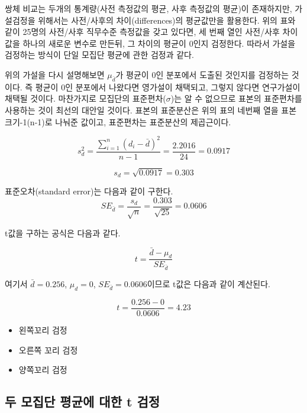 \documentclass[
]{book}
\begin{document}
쌍체 비교는 두개의 통계량(사전 측정값의 평균, 사후 측정값의 평균)이 존재하지만, 가설검정을 위해서는 사전/사후의 차이(differences)의 평균값만을 활용한다. 위의 표와 같이 25명의 사전/사후 직무수준 측정값을 갖고 있다면, 세 번째 열인 사전/사후 차이값을 하나의 새로운 변수로 만든뒤, 그 차이의 평균이 0인지 검정한다. 따라서 가설을 검정하는 방식이 단일 모집단 평균에 관한 검정과 같다.

위의 가설을 다시 설명해보면 \(\mu_{\bar{d}}\)가 평균이 0인 분포에서 도출된 것인지를 검정하는 것이다. 즉 평균이 0인 분포에서 나왔다면 영가설이 채택되고, 그렇지 않다면 연구가설이 채택될 것이다. 마찬가지로 모집단의 표준편차(\(\sigma\))는 알 수 없으므로 표본의 표준편차를 사용하는 것이 최선의 대안일 것이다. 표본의 표준분산은 위의 표의 네번째 열을 표본크기-1(n-1)로 나눠준 값이고, 표준편차는 표준분산의 제곱근이다.

\begin{equation}
s_d^2=\frac{\sum_{i=1}^{n}(d_i-\bar d)^2}{n-1}
=\frac{2.2016}{24}
=0.0917
\label{eq:pairedvar}
\end{equation}

\begin{equation}
s_d
=
\sqrt{0.0917}
=
0.303
\label{eq:pairedsd}
\end{equation}

표준오차(standard error)는 다음과 같이 구한다.
\begin{equation}
SE_{\bar d}
=
\frac{s_d}{\sqrt n}
=
\frac{0.303}{\sqrt{25}}
=
0.0606
\label{eq:pairedse}
\end{equation}

t값을 구하는 공식은 다음과 같다.

\begin{equation}
t
=
\frac{\bar d-\mu_d}
{SE_{\bar d}}
\label{eq:pairedt}
\end{equation}

여기서 \(\bar d=0.256\), \(\mu_d=0\), \(SE_{\bar d}=0.0606\)이므로 t값은 다음과 같이 계산된다.

\begin{equation}
t
=
\frac{0.256-0}{0.0606}
=
4.23
\label{eq:pairedtexample}
\end{equation}

\begin{itemize}
\item
  왼쪽꼬리 검정
\item
  오른쪽 꼬리 검정
\item
  양쪽꼬리 검정
\end{itemize}

\subsection{두 모집단 평균에 대한 t 검정}\label{uxb450-uxbaa8uxc9d1uxb2e8-uxd3c9uxade0uxc5d0-uxb300uxd55c-t-uxac80uxc815}
\end{document}
